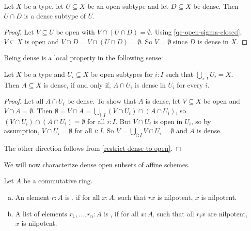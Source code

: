\begin{lemma}%
  \label{restrict-dense-to-open}
  Let $X$ be a type,
  let $U \subseteq X$ be an open subtype
  and let $D \subseteq X$ be dense.
  Then $U \cap D$ is a dense subtype of $U$.
\end{lemma}

\begin{proof}
  Let $V\subseteq U$ be open with $V \cap (U\cap D)=\emptyset$.
  Using \cref{qc-open-sigma-closed}, $V\subseteq X$ is open
  and $V\cap D = V\cap (U\cap D)=\emptyset$.
  So $V=\emptyset$ since $D$ is dense in $X$.
\end{proof}

Being dense is a local property in the following sense:

\begin{lemma}%
  \label{dense-local}
  Let $X$ be a type
  and $U_i\subseteq X$ be open subtypes for $i:I$ such that $\bigcup_{i:I}U_i=X$.
  Then $A\subseteq X$ is dense, if and only if,
  $A\cap U_i$ is dense in $U_i$ for every $i$.
\end{lemma}

\begin{proof}
  Let all $A\cap U_i$ be dense.
  To show that $A$ is dense, let $V\subseteq X$ be open and $V\cap A= \emptyset$.
  Then $\emptyset=V\cap A=\bigcup_{i:I}(V\cap U_i)\cap (A\cap U_i)$,
  so $(V\cap U_i)\cap (A\cap U_i) = \emptyset$ for all $i:I$.
  But $V\cap U_i$ is open in $U_i$, so by assumption, $V\cap U_i=\emptyset$ for all $i:I$.
  So $V=\bigcup_{i:I}V\cap U_i=\emptyset$ and $A$ is dense.

  The other direction follows from \cref{restrict-dense-to-open}.
\end{proof}

We will now characterize dense open subsets of affine schemes.

\begin{definition}
  Let $A$ be a commutative ring.
  \begin{enumerate}[(a)]
  \item An element $r:A$ is , if for all $x:A$, such that $rx$ is nilpotent, $x$ is nilpotent.
  \item A list of elements $r_1,\dots,r_n:A$ is , if for all $x:A$,
    such that all $r_ix$ are nilpotent, $x$ is nilpotent.
  \end{enumerate}
\end{definition}

